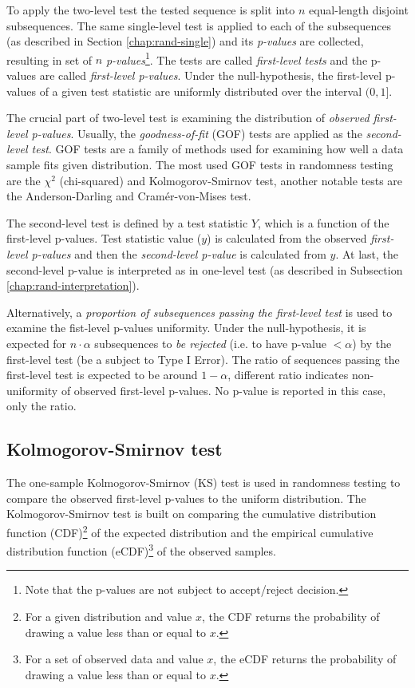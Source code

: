 \documentclass[
  digital,     %
  oneside,     %
  nosansbold,  %
  nocolorbold, %
  nolof,         %
  nolot,         %
]{fithesis4}
\begin{document}
To apply the two-level test the tested sequence is split into $n$ equal-length disjoint subsequences. The same single-level test is applied to each of the subsequences (as described in Section \ref{chap:rand-single}) and its \emph{p-values} are collected, resulting in set of $n$ \emph{p-values}\footnote{Note that the p-values are not subject to accept/reject decision.}. The tests are called \emph{first-level tests} and the p-values are called \emph{first-level p-values}. Under the null-hypothesis, the first-level p-values of a given test statistic are uniformly distributed over the interval $(0,1]$. \cite[p. 14]{bad_day} 

The crucial part of two-level test is examining the distribution of \emph{observed first-level p-values}. Usually, the \emph{goodness-of-fit} (GOF) tests are applied as the \emph{second-level test}. \cite[p. 6]{tu01_paper} GOF tests are a family of methods used for examining how well a data sample fits given distribution. \cite[p. 1]{GOF-techniques} The most used GOF tests in randomness testing are the $\chi^2$ (chi-squared) and Kolmogorov-Smirnov test, another notable tests are the Anderson-Darling and Cramér-von-Mises test. \cite[p. 14]{bad_day}

The second-level test is defined by a test statistic $Y$, which is a function of the first-level p-values. Test statistic value ($y$) is calculated from the observed \emph{first-level p-values} and then the \emph{second-level p-value} is calculated from $y$. At last, the second-level p-value is interpreted as in one-level test (as described in Subsection \ref{chap:rand-interpretation}). 

Alternatively, a \emph{proportion of subsequences passing the first-level test} is used to examine the fist-level p-values uniformity. Under the null-hypothesis, it is expected for $n\cdot\alpha$ subsequences to \emph{be rejected} (i.e. to have p-value $< \alpha$) by the first-level test (be a subject to Type I Error). The ratio of sequences passing the first-level test is expected to be around $1-\alpha$, different ratio indicates non-uniformity of observed first-level p-values. \cite[p. 4-2]{nist_special} No p-value is reported in this case, only the ratio.


\subsection{Kolmogorov-Smirnov test}
The one-sample Kolmogorov-Smirnov (KS) test is used in randomness testing to compare the observed first-level p-values to the uniform distribution. The Kolmogorov-Smirnov test is built on comparing the cumulative distribution function (CDF)\footnote{For a given distribution and value $x$, the CDF returns the probability of drawing a value less than or equal to $x$.} of the expected distribution and the empirical cumulative distribution function (eCDF)\footnote{For a set of observed data and value $x$, the eCDF returns the probability of drawing a value less than or equal to $x$.} of the observed samples. %
\end{document}
